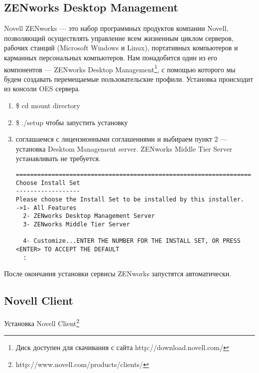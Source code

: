 \subsection{ZENworks Desktop Management}
Novell ZENworks --- это набор программных продуктов компании Novell, позволяющий осуществлять управление всем жизненным циклом серверов, рабочих станций (Microsoft Windows и Linux), портативных компьютеров и карманных персональных компьютеров. Нам понадобится один из его компонентов --- ZENworks Desktop Management\footnote{Диск доступен для скачивания с сайта http://download.novell.com/}, с помощью которого мы будем создавать перемещаемые пользовательские профили. Установка происходит из консоли OES сервера.
\begin{enumerate}
  \item \textsf{\$ cd} mount directory
  \item \textsf{\$ ./setup} чтобы запустить установку
  \item соглашаемся с лицензионными соглашениями и выбираем пункт 2 --- установка Desktom Management server. ZENworks Middle Tier Server устанавливать не требуется.
  \begin{verbatim}
==================================================================
Choose Install Set
------------------
Please choose the Install Set to be installed by this installer.
->1- All Features
  2- ZENworks Desktop Management Server
  3- ZENworks Middle Tier Server

  4- Customize...ENTER THE NUMBER FOR THE INSTALL SET, OR PRESS <ENTER> TO ACCEPT THE DEFAULT
  :
  \end{verbatim} 
\end{enumerate}
После окончания установки сервисы ZENworks запустятся автоматически.

\subsection{Novell Client}
Установка Novell Client\footnote{http://www.novell.com/products/clients/}